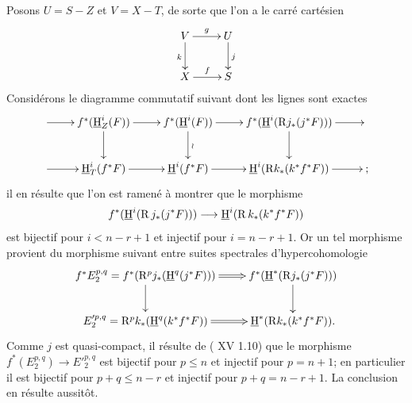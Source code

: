Posons $U=S-Z$ et $V=X-T$, de sorte que l'on a le carr\'e cart\'esien
$$
\xymatrix{
V \ar[r]^-g\ar[d]_k& U\ar[d]^j\\
X \ar[r]^-f&S
}$$
Consid\'erons le diagramme commutatif suivant dont les lignes sont exactes
$$
\xymatrix{ {}\ar[r]&{f^*(\underline{\mathrm{H}}_Z^i(F))}\ar[r]\ar[d]& {f^*(\underline{\mathrm{H}}^i(F))}\ar[r]\ar[d]^{\wr} &{f^*(\underline{\mathrm{H}}^i(\mathrm{R} j_*(j^*F)))}\ar[r]\ar[d]& \\
{}\ar[r] &{\underline{\mathrm{H}}_T^i(f^*F)}\ar[r]& {\underline{\mathrm{H}}^i(f^*F)} \ar[r]&{\underline{\mathrm{H}}^i(\mathrm{R} k_*(k^*f^*F))} \ar[r]&\text{;}}$$
il en r\'esulte que l'on est ramen\'e \`a montrer que le morphisme
$$f^*({\mathop{\underline{\mathrm{H}}}\nolimits}^i(\R j_*(j^*F)))\to {\mathop{\underline{\mathrm{H}}}\nolimits}^i(\R k_*(k^*f^*F))$$
est bijectif pour $i<n-r+1$ et injectif pour $i=n-r+1$. Or un tel morphisme provient du morphisme suivant entre suites spectrales d'hypercohomologie
$$
\xymatrix{{f^*E_2^{p, q}=f^*(\mathrm{R}^pj_*(\underline{\mathrm{H}}^q(j^*F)))}\ar@{=>} [r]\ar[d]&{f^*(\underline{\mathrm{H}}^*(\mathrm{R} j_*(j^*F)))}\ar[d]\\
{E^{\prime p, q}_2=\mathrm{R}^pk_*(\underline{\mathrm{H}}^q(k^*f^*F))}\ar@{=>}[r]&{\underline{\mathrm{H}}^*(\mathrm{R} k_*(k^*f^*F)).}}
$$
Comme $j$ est quasi-compact, il r\'esulte de ( XV 1.10) que le morphisme $f^*(E^{p, q}_2)\to E'^{p, q}_2$ est bijectif pour $p\leq n$ et injectif pour $p=n+1$; en particulier il est bijectif pour $p+q\leq n-r$ et injectif pour $p+q=n-r+1$. La conclusion en r\'esulte aussit\^{o}t.


